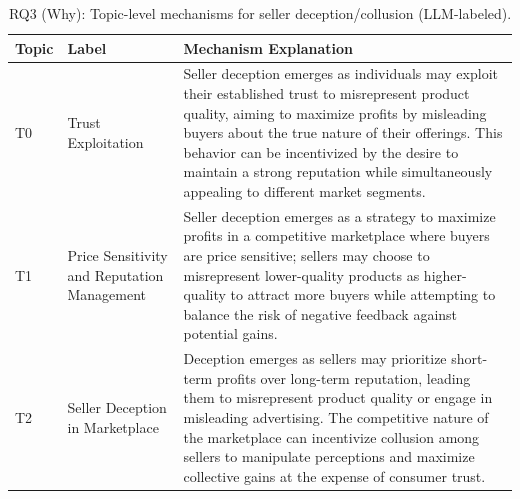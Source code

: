 \begin{table}[!h]
    \centering
    \small
    \caption{RQ3 (Why): Topic-level mechanisms for seller deception/collusion (LLM-labeled).}
    \label{tab:rq3_collusion_mechanisms}
    \begin{tabular}{p{}p{}p{}}
    \toprule
    \textbf{Topic} & \textbf{Label} & \textbf{Mechanism Explanation} \\
    \midrule
    T0 & Trust Exploitation & Seller deception emerges as individuals may exploit their established trust to misrepresent product quality, aiming to maximize profits by misleading buyers about the true nature of their offerings. This behavior can be incentivized by the desire to maintain a strong reputation while simultaneously appealing to different market segments. \\
    T1 & Price Sensitivity and Reputation Management & Seller deception emerges as a strategy to maximize profits in a competitive marketplace where buyers are price sensitive; sellers may choose to misrepresent lower-quality products as higher-quality to attract more buyers while attempting to balance the risk of negative feedback against potential gains. \\
    T2 & Seller Deception in Marketplace & Deception emerges as sellers may prioritize short-term profits over long-term reputation, leading them to misrepresent product quality or engage in misleading advertising. The competitive nature of the marketplace can incentivize collusion among sellers to manipulate perceptions and maximize collective gains at the expense of consumer trust. \\
    \bottomrule
    \end{tabular}
\end{table}